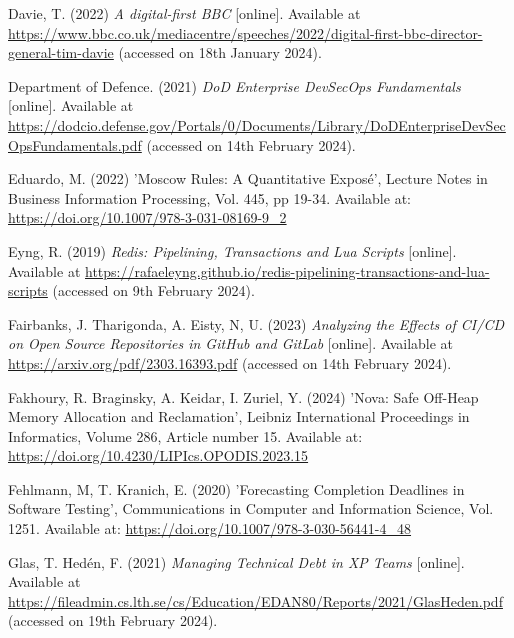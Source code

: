 \noindent Davie, T. (2022) \textit{A digital-first BBC} [online]. Available at \url{https://www.bbc.co.uk/mediacentre/speeches/2022/digital-first-bbc-director-general-tim-davie} (accessed on 18th January 2024).
\vspace{0.2cm}

\noindent Department of Defence. (2021) \textit{DoD Enterprise DevSecOps Fundamentals} [online]. Available at \url{https://dodcio.defense.gov/Portals/0/Documents/Library/DoDEnterpriseDevSecOpsFundamentals.pdf} (accessed on 14th February 2024).
\vspace{0.2cm}

\noindent Eduardo, M. (2022) 'Moscow Rules: A Quantitative Exposé', Lecture Notes in Business Information Processing, Vol. 445, pp 19-34. Available at: \url{https://doi.org/10.1007/978-3-031-08169-9_2}
\vspace{0.2cm}

\noindent Eyng, R. (2019) \textit{Redis: Pipelining, Transactions and Lua Scripts} [online]. Available at \url{https://rafaeleyng.github.io/redis-pipelining-transactions-and-lua-scripts} (accessed on 9th February 2024).
\vspace{0.2cm}

\noindent Fairbanks, J. Tharigonda, A. Eisty, N, U. (2023) \textit{Analyzing the Effects of CI/CD on Open Source Repositories in GitHub and GitLab} [online]. Available at \url{https://arxiv.org/pdf/2303.16393.pdf} (accessed on 14th February 2024).
\vspace{0.2cm}

\noindent Fakhoury, R. Braginsky, A. Keidar, I. Zuriel, Y. (2024) 'Nova: Safe Off-Heap Memory Allocation and Reclamation', Leibniz International Proceedings in Informatics, Volume 286, Article number 15. Available at: \url{https://doi.org/10.4230/LIPIcs.OPODIS.2023.15}
\vspace{0.2cm}

\noindent Fehlmann, M, T. Kranich, E. (2020) 'Forecasting Completion Deadlines in Software Testing', Communications in Computer and Information Science, Vol. 1251. Available at: \url{https://doi.org/10.1007/978-3-030-56441-4_48}
\vspace{0.2cm}

\noindent Glas, T. Hedén, F. (2021) \textit{Managing Technical Debt in XP Teams} [online]. Available at \url{https://fileadmin.cs.lth.se/cs/Education/EDAN80/Reports/2021/GlasHeden.pdf} (accessed on 19th February 2024).
\vspace{0.2cm}

